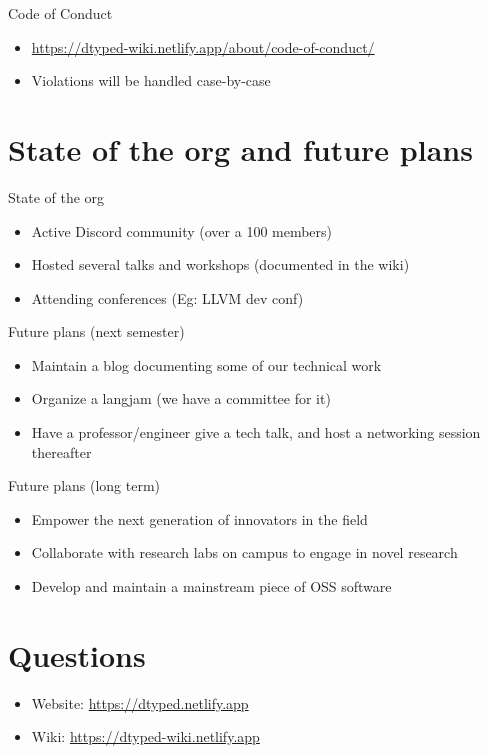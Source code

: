 \documentclass{beamer}
\begin{document}
\begin{frame}{Code of Conduct}
  \begin{itemize}
  \item \url{https://dtyped-wiki.netlify.app/about/code-of-conduct/}
  \item Violations will be handled case-by-case
  \end{itemize}
\end{frame}

\section{State of the org and future plans}

\begin{frame}{State of the org}
  \begin{itemize}
  \item Active Discord community (over a 100 members)
  \item Hosted several talks and workshops (documented in the wiki)
  \item Attending conferences (Eg: LLVM dev conf)
  \end{itemize}
\end{frame}

\begin{frame}{Future plans (next semester)}
  \begin{itemize}
  \item Maintain a blog documenting some of our technical work
  \item Organize a langjam (we have a committee for it)
  \item Have a professor/engineer give a tech talk, and host a networking session thereafter
  \end{itemize}
\end{frame}

\begin{frame}{Future plans (long term)}
  \begin{itemize}
  \item Empower the next generation of innovators in the field
  \item Collaborate with research labs on campus to engage in novel research
  \item Develop and maintain a mainstream piece of OSS software
  \end{itemize}
\end{frame}

\section{Questions}

\begin{frame}
  \begin{itemize}
  \item Website: \url{https://dtyped.netlify.app}
  \item Wiki: \url{https://dtyped-wiki.netlify.app}
  \end{itemize}
\end{frame}
\end{document}
